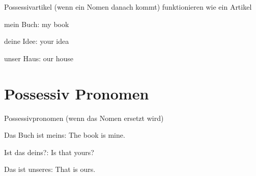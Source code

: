 \documentclass[a4paper]{article}
\title{}
\date{}
\begin{document}
    \maketitle
    
    Possessivartikel (wenn ein Nomen danach kommt)
    funktionieren wie ein Artikel
    
    mein Buch: my book
    
    deine Idee: your idea
    
    unser Haus: our house
    
    \section{Possessiv Pronomen}
    Possessivpronomen (wenn das Nomen ersetzt wird)
    
    Das Buch ist meins: The book is mine.
    
    Ist das deins?: Is that yours?
    
    Das ist unseres: That is ours.
\end{document}
